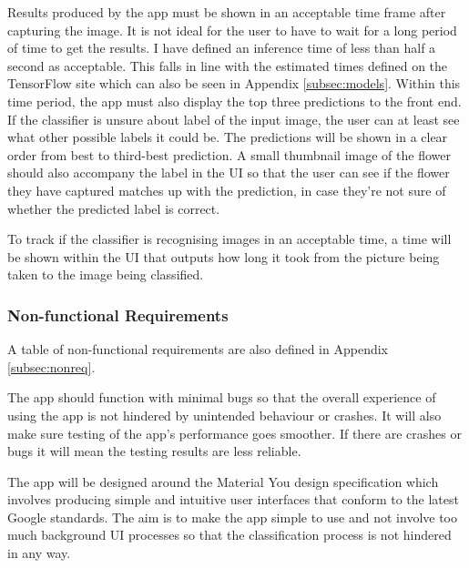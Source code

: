 \documentclass{article}
\begin{document}
\par

Results produced by the app must be shown in an acceptable time frame after capturing the image. It is not ideal for 
the user to have to wait for a long period of time to get the results. I have defined an inference time of less than 
half a second as acceptable. This falls in line with the estimated times defined on the TensorFlow site which can also 
be seen in Appendix \ref{subsec:models}. Within this time period, the app must also display the top three predictions 
to the front end. 
If the classifier is unsure about label of the input image, the user can at least see what other possible labels it 
could be. The predictions will be shown in a clear order from best to third-best prediction. A small thumbnail image of 
the flower should also accompany the label in the UI so that the user can see if the flower they have captured matches 
up with the prediction, in case they're not sure of whether the predicted label is correct. 

\par

To track if the classifier is recognising images in an acceptable time, a time will be shown within the UI that outputs 
how long it took from the picture being taken to the image being classified.

\subsubsection{Non-functional Requirements}

A table of non-functional requirements are also defined in Appendix \ref{subsec:nonreq}.

\par

The app should function with minimal bugs so that the overall experience of using the app is not hindered by unintended 
behaviour or crashes. It will also make sure testing of the app's performance goes smoother. If there are crashes or 
bugs it will mean the testing results are less reliable.

\par

The app will be designed around the Material You design specification which involves producing simple and intuitive user
interfaces that conform to the latest Google standards. The aim is to make the app simple to use and not involve too 
much background UI processes so that the classification process is not hindered in any way. 
\end{document}
